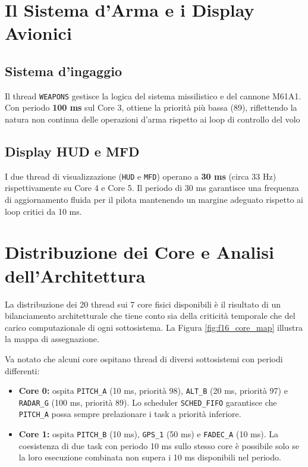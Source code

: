 \section{Il Sistema d'Arma e i Display Avionici}

\subsection{Sistema d'ingaggio}
Il thread \texttt{WEAPONS} gestisce la logica del sistema missilistico e del cannone M61A1. Con periodo \textbf{100 ms} sul Core 3, ottiene la priorità più bassa (89), riflettendo la natura non continua delle operazioni d'arma rispetto ai loop di controllo del volo 

\subsection{Display HUD e MFD}
I due thread di visualizzazione (\texttt{HUD} e \texttt{MFD}) operano a \textbf{30 ms} (circa 33 Hz) rispettivamente su Core 4 e Core 5. Il periodo di 30 ms garantisce una frequenza di aggiornamento fluida per il pilota mantenendo un margine adeguato rispetto ai loop critici da 10 ms.

\section{Distribuzione dei Core e Analisi dell'Architettura}
La distribuzione dei 20 thread sui 7 core fisici disponibili è il risultato di un bilanciamento architetturale che tiene conto sia della criticità temporale che del carico computazionale di ogni sottosistema. La Figura \ref{fig:f16_core_map} illustra la mappa di assegnazione.


Va notato che alcuni core ospitano thread di diversi sottosistemi con periodi differenti:
\begin{itemize}
	\item \textbf{Core 0:} ospita \texttt{PITCH\_A} (10 ms, priorità 98), \texttt{ALT\_B} (20 ms, priorità 97) e \texttt{RADAR\_G} (100 ms, priorità 89). Lo scheduler \texttt{SCHED\_FIFO} garantisce che \texttt{PITCH\_A} possa sempre prelazionare i task a priorità inferiore.
	\item \textbf{Core 1:} ospita \texttt{PITCH\_B} (10 ms), \texttt{GPS\_1} (50 ms) e \texttt{FADEC\_A} (10 ms). La coesistenza di due task con periodo 10 ms sullo stesso core è possibile solo se la loro esecuzione combinata non supera i 10 ms disponibili nel periodo.
\end{itemize}

